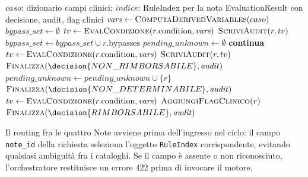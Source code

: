 \begin{algorithm}[htbp]
\caption{Valutazione di un caso clinico (\texttt{evaluate})}
\label{alg:rule-eval}
\begin{algorithmic}[1]
\Require $caso$: dizionario campi clinici; $indice$: RuleIndex per la nota
\Ensure EvaluationResult con decisione, audit, flag clinici
\State $\mathit{vars} \gets \textsc{ComputaDerivedVariables}(caso)$
\State $\mathit{bypass\_set} \gets \emptyset$
\State {}
  \State $tv \gets \textsc{EvalCondizione}(r.\text{condition}, \mathit{vars})$
  \State $\textsc{ScriviAudit}(r, tv)$
    \State $\mathit{bypass\_set} \gets \mathit{bypass\_set} \cup r.\text{bypasses}$
  \EndIf
\EndFor
\State {}
  \State $\mathit{pending\_unknown} \gets \emptyset$
     \State \textbf{continua}
    \EndIf
    \State $tv \gets \textsc{EvalCondizione}(r.\text{condition}, \mathit{vars})$
    \State $\textsc{ScriviAudit}(r, tv)$
      \State \Return $\textsc{Finalizza}(\decision{NON\_RIMBORSABILE}, \mathit{audit})$
    \EndIf
      \State $\mathit{pending\_unknown} \gets \mathit{pending\_unknown} \cup \{r\}$
    \EndIf
  \EndFor
    \State \Return $\textsc{Finalizza}(\decision{NON\_DETERMINABILE}, \mathit{audit})$
  \EndIf
\EndFor
\State {}
  \State $tv \gets \textsc{EvalCondizione}(r.\text{condition}, \mathit{vars})$
    \State $\textsc{AggiungiFlagClinico}(r)$
  \EndIf
\EndFor
\State \Return $\textsc{Finalizza}(\decision{RIMBORSABILE}, \mathit{audit})$
\end{algorithmic}
\end{algorithm}

Il routing fra le quattro Note avviene prima dell'ingresso nel ciclo: il campo
\texttt{note\_id} della richiesta seleziona l'oggetto \texttt{RuleIndex}
corrispondente, evitando qualsiasi ambiguità fra i cataloghi. Se il campo è
assente o non riconosciuto, l'orchestratore restituisce un errore 422 prima
di invocare il motore.

